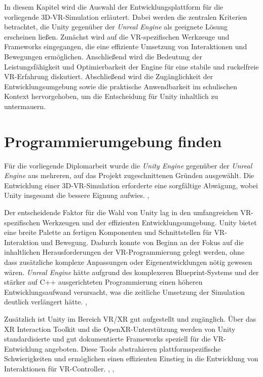
In diesem Kapitel wird die Auswahl der Entwicklungsplattform für die vorliegende 3D-VR-Simulation erläutert. Dabei werden die zentralen Kriterien betrachtet, die Unity gegenüber der \textit{Unreal Engine} als geeignete Lösung erscheinen ließen. Zunächst wird auf die VR-spezifischen Werkzeuge und Frameworks eingegangen, die eine effiziente Umsetzung von Interaktionen und Bewegungen ermöglichen. Anschließend wird die Bedeutung der Leistungsfähigkeit und Optimierbarkeit der Engine für eine stabile und ruckelfreie VR-Erfahrung diskutiert. Abschließend wird die Zugänglichkeit der Entwicklungsumgebung sowie die praktische Anwendbarkeit im schulischen Kontext hervorgehoben, um die Entscheidung für Unity inhaltlich zu untermauern.

\section{Programmierumgebung finden}

Für die vorliegende Diplomarbeit wurde die \textit{Unity Engine} gegenüber der \textit{Unreal Engine} aus mehreren, auf das Projekt zugeschnittenen Gründen ausgewählt. Die Entwicklung einer 3D-VR-Simulation erforderte 
eine sorgfältige Abwägung, wobei Unity insgesamt die bessere Eignung aufwies.
\cite{NimrodKramer2024}, \cite{YuriPitomcev2025}

Der entscheidende Faktor für die Wahl von Unity lag in den umfangreichen VR-spezifischen Werkzeugen und der effizienten Entwicklungsumgebung. Unity bietet eine breite Palette an fertigen Komponenten und Schnittstellen für VR-Interaktion und Bewegung. Dadurch konnte von Beginn an der Fokus auf die inhaltlichen Herausforderungen der VR-Programmierung gelegt werden, ohne dass zusätzliche komplexe Anpassungen oder Eigenentwicklungen nötig gewesen wären. \textit{Unreal Engine} hätte aufgrund des komplexeren Blueprint-Systems und der stärker auf C++ ausgerichteten Programmierung einen höheren Entwicklungsaufwand verursacht, was die zeitliche Umsetzung der Simulation deutlich verlängert hätte.
\cite{NimrodKramer2024}, \cite{XRBootcamp2022}

Zusätzlich ist Unity im Bereich VR/XR gut aufgestellt und zugänglich. Über das XR Interaction Toolkit 
und die OpenXR-Unterstützung werden von Unity standardisierte und gut dokumentierte Frameworks speziell für die VR-Entwicklung angeboten. Diese Tools abstrahieren plattformspezifische Schwierigkeiten und ermöglichen einen effizienten Einstieg in die Entwicklung von Interaktionen für VR-Controller. 
\cite{NimrodKramer2024}, \cite{YuriPitomcev2025}, \cite{XRBootcamp2022}


